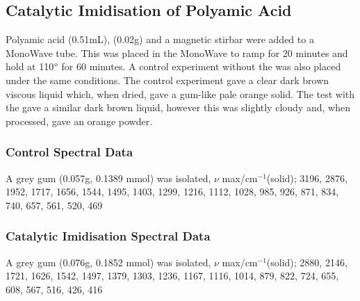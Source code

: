 \subsection{Catalytic Imidisation of Polyamic Acid}

Polyamic acid (0.51mL),  (0.02g) and a magnetic stirbar were added to a MonoWave tube. This was placed in the MonoWave  to ramp for 20 minutes and hold at 110$\degree$ for 60 minutes. A control experiment without the  was also placed under the same conditions. The control experiment gave a clear dark brown viscous liquid which, when dried, gave a gum-like pale orange solid. The test with the  gave a similar dark brown liquid, however this was slightly cloudy and, when processed, gave an orange powder.

\subsubsection{Control Spectral Data}
A grey gum (0.057g, 0.1389 mmol) was isolated, $\nu$ max/cm$^{-1}$(solid); 3196, 2876, 1952, 1717, 1656, 1544, 1495, 1403, 1299, 1216, 1112, 1028, 985, 926, 871, 834, 740, 657, 561, 520, 469

\subsubsection{Catalytic Imidisation Spectral Data}
A grey gum (0.076g, 0.1852 mmol) was isolated, $\nu$ max/cm$^{-1}$(solid); 2880, 2146, 1721, 1626, 1542, 1497, 1379, 1303, 1236, 1167, 1116, 1014, 879, 822, 724, 655, 608, 567, 516, 426, 416


